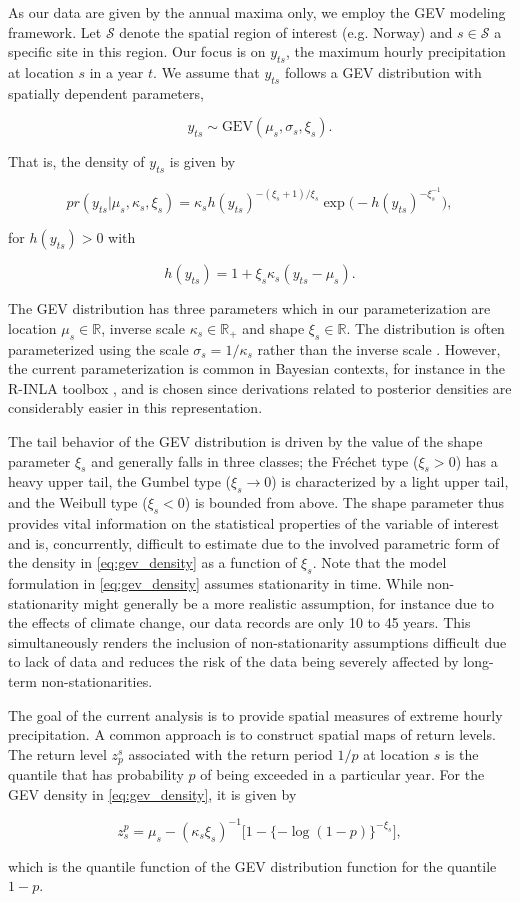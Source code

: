 \documentclass[11pt,english]{article}
\newcommand{\real}{\mathbb{R}}
\newcommand{\bl}{\begin{linenomath}}
\newcommand{\el}{\end{linenomath}}
\begin{document}
As our data are given by the annual maxima only, we employ the GEV modeling framework.   Let $\mathcal{S}$ denote the spatial region of interest (e.g. Norway) and $s\in\mathcal{S}$ a specific site in this region.  Our focus is on $y_{ts}$, the maximum hourly precipitation at location $s$ in a year $t$.  We assume that $y_{ts}$ follows a GEV distribution with spatially dependent parameters, 
\bl\[
y_{ts} \sim \text{GEV}(\mu_s,\sigma_s,\xi_s). 
\]\el
That is, the density of $y_{ts}$ is given by 
\bl\begin{equation}\label{eq:gev_density}
pr(y_{ts}| \mu_s, \kappa_s, \xi_s) = \kappa_s h(y_{ts})^{-(\xi_s + 1)/\xi_s} \exp \Big( - h(y_{ts})^{-\xi_s^{-1}}\Big), 
\end{equation}\el
for $h(y_{ts}) > 0$ with 
\bl\[
h(y_{ts}) = 1 + \xi_s \kappa_s (y_{ts} - \mu_s).
\]\el
The GEV distribution has three parameters which in our parameterization are location $\mu_{s} \in \real$, inverse scale $\kappa_{s} \in \real_+$ and shape $\xi_{s} \in \real$. The distribution is often parameterized using the scale $\sigma_s = 1/\kappa_s$ rather than the inverse scale \citep[e.g.][]{Coles2001}. However, the current parameterization is common in Bayesian contexts, for instance in the R-INLA toolbox \citep[\url{http://www.r-inla.org},][]{Rueetal2009}, and is chosen since derivations related to posterior densities are considerably easier in this representation.  

The tail behavior of the GEV distribution is driven by the value of the shape parameter $\xi_s$ and generally falls in three classes; the Fr\'echet type ($\xi_{s}>0$) has a heavy upper tail, the Gumbel type ($\xi_{s} \rightarrow 0$) is characterized by a light upper tail, and the Weibull type ($\xi_{s}<0$) is bounded from above.  The shape parameter thus provides vital information on the statistical properties of the variable of interest and is, concurrently, difficult to estimate due to the involved parametric form of the density in \eqref{eq:gev_density} as a function of $\xi_s$.  Note that the model formulation in \eqref{eq:gev_density} assumes stationarity in time.  While non-stationarity might generally be a more realistic assumption, for instance due to the effects of climate change, our data records are only 10 to 45 years.  This simultaneously renders the inclusion of non-stationarity assumptions difficult due to lack of data and reduces the risk of the data being severely affected by long-term non-stationarities.

The goal of the current analysis is to provide spatial measures of extreme hourly precipitation.  A common approach is to construct spatial maps of return levels.  The return level $z_p^{s}$ associated with the return period $1/p$ at location $s$ is the quantile that has probability $p$ of being exceeded in a particular year.  For the GEV density in \eqref{eq:gev_density}, it is given by 
\bl\begin{equation}\label{eq:retlev}
z_s^p = \mu_{s} -  (\kappa_s \xi_s )^{-1} \big[1 - \{ - \log(1 - p)\}^{-\xi_s}\big], 
\end{equation}\el
which is the quantile function of the GEV distribution function for the quantile $1-p$. 
\end{document}
